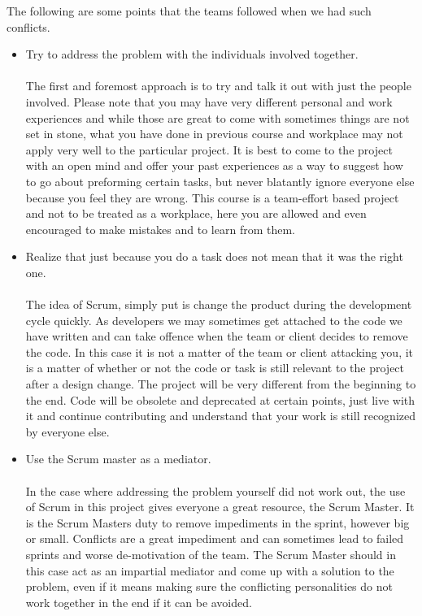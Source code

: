 The following are some points that the teams followed when we had such conflicts.
\begin{itemize}
\item Try to address the problem with the individuals involved together.\\ \\
The first and foremost approach is to try and talk it out with just the people involved. Please note that you may have very different personal and work experiences and while those are great to come with sometimes things are not set in stone, what you have done in previous course and workplace may not apply very well to the particular project. It is best to come to the project with an open mind and offer your past experiences as a way to suggest how to go about preforming certain tasks, but never blatantly ignore everyone else because you feel they are wrong. This course is a team-effort based project and not to be treated as a workplace, here you are allowed and even encouraged to make mistakes and to learn from them.

\item Realize that just because you do a task does not mean that it was the right one.\\ \\
The idea of Scrum, simply put is change the product during the development cycle quickly. As developers we may sometimes get attached to the code we have written and can take offence when the team or client decides to remove the code. In this case it is not a matter of the team or client attacking you, it is a matter of whether or not the code or task is still relevant to the project after a design change. The project will be very different from the beginning to the end. Code will be obsolete and deprecated at certain points, just live with it and continue contributing and understand that your work is still recognized by everyone else.
 \\
\item Use the Scrum master as a mediator.\\ \\
In the case where addressing the problem yourself did not work out, the use of Scrum in this project gives everyone a great resource, the Scrum Master. It is the Scrum Masters duty to remove impediments in the sprint, however big or small. Conflicts are a great impediment and can sometimes lead to failed sprints and worse de-motivation of the team. The Scrum Master should in this case act as an impartial mediator and come up with a solution to the problem, even if it means making sure the conflicting personalities do not work together in the end if it can be avoided.

\end{itemize}
